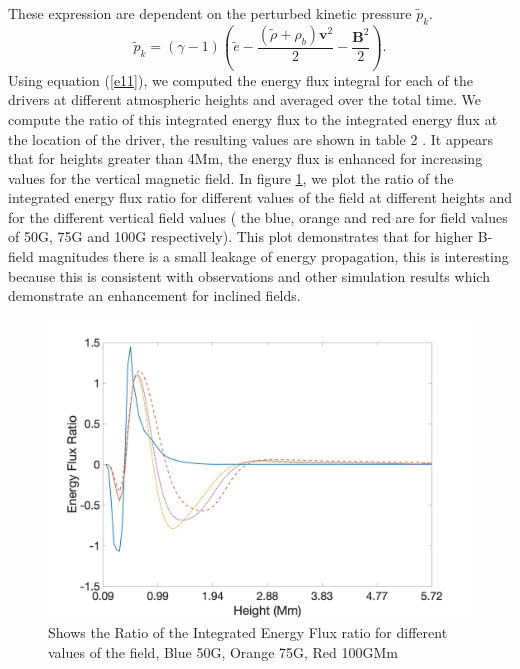 \documentclass[linenumbers]{aastex63}
\begin{document}
These expression are dependent on the perturbed kinetic pressure $\tilde{p}_{k}$.
$$
\tilde{p}_{k}=\left(\gamma - 1\right)\left( \tilde{e}-\frac{ \left( \tilde{\rho} +\rho_b \right){\mathbf v}^2}{2}-\frac{{\mathbf B}^2}{2}\right).
$$
Using equation (\ref{e11}), we computed the energy flux integral for each of the drivers at different atmospheric heights and averaged over the total time. We compute the ratio of this integrated energy flux to the integrated energy flux at the location of the driver, the resulting values are shown in table 2 . It appears that for heights greater than 4Mm, the energy flux is enhanced for increasing values for the vertical magnetic field. In figure \ref{energyfluxratio_50G_75G_100G_line},  we plot the ratio of the integrated energy flux ratio for different values of the field at different heights and for the different vertical field values ( the blue, orange and red  are for field values of 50G, 75G and 100G respectively). This plot demonstrates that for higher B-field magnitudes there is a small leakage of energy propagation, this is interesting because this is consistent with observations and other simulation results which demonstrate an enhancement for inclined fields.




\begin{figure}
    \label{energyfluxratio_50G_75G_100G_line}
    \centering
    \includegraphics[scale=0.2]{energyfluxratio.jpg}
    \caption{Shows the Ratio of the Integrated Energy Flux ratio for different values of the field, Blue 50G, Orange 75G, Red 100GMm}
\end{figure}
\end{document}
